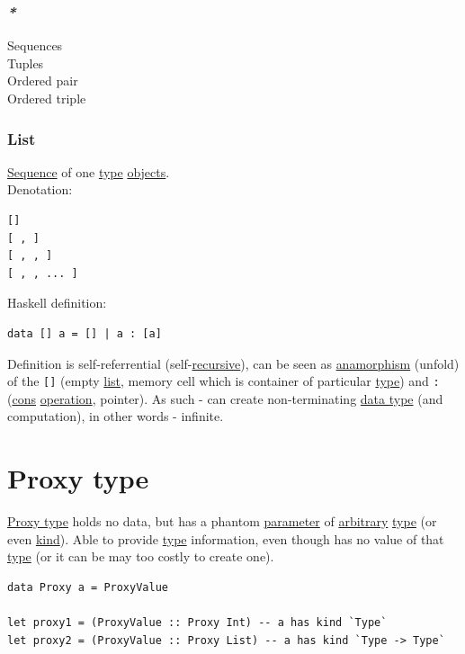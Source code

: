 \documentclass[a4paper,14pt,oneside]{book}
\begin{document}
\subsubsection{\emph{*}}
\label{sec:orgb24aba0}

\label{orgb8c24d8}Sequences\\
\label{orgf4c74f5}Tuples\\
\label{orgf727e0f}Ordered pair\\
\label{org80578f0}Ordered triple\\

\subsubsection{\label{org0c4e6d8}List}
\label{sec:orge1845c5}
\hyperref[org338dde1]{Sequence} of one \hyperref[org86debe5]{type} \hyperref[orgab50636]{objects}.\\

Denotation:\\
\begin{verbatim}
[]
[ , ]
[ , , ]
[ , , ... ]
\end{verbatim}

Haskell definition:\\
\begin{verbatim}
data [] a = [] | a : [a]
\end{verbatim}

Definition is self-referrential (self-\hyperref[org578f44e]{recursive}), can be seen as \hyperref[org6392ee8]{anamorphism} (unfold) of the \texttt{[]} (empty \hyperref[org0c4e6d8]{list}, memory cell which is container of particular \hyperref[org86debe5]{type}) and \texttt{:} (\hyperref[orgb07eb40]{cons} \hyperref[org2201dac]{operation}, pointer). As such - can create non-terminating \hyperref[orgb52ba15]{data type} (and computation), in other words - infinite.\\

\section{\label{org3a6e517}Proxy type}
\label{sec:org50f5729}
\hyperref[org3a6e517]{Proxy type} holds no data, but has a phantom \hyperref[org003d9b4]{parameter} of \hyperref[org7111dc3]{arbitrary} \hyperref[org86debe5]{type} (or even \hyperref[org25f6ab4]{kind}). Able to provide \hyperref[org86debe5]{type} information, even though has no value of that \hyperref[org86debe5]{type} (or it can be may too costly to create one).\\
\begin{verbatim}
data Proxy a = ProxyValue

let proxy1 = (ProxyValue :: Proxy Int) -- a has kind `Type`
let proxy2 = (ProxyValue :: Proxy List) -- a has kind `Type -> Type`
\end{verbatim}
\end{document}
